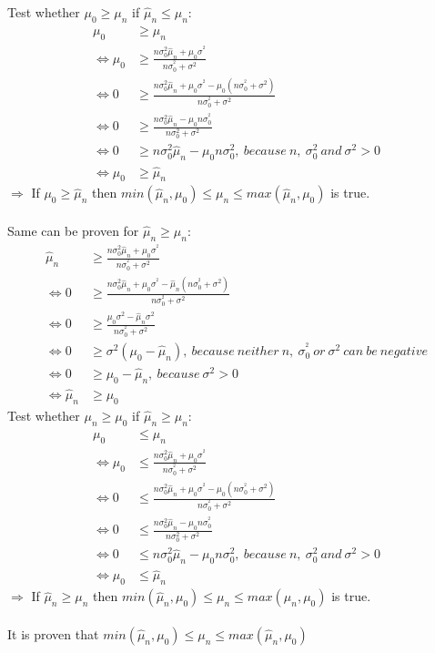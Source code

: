 \hspace*{5mm}Test whether $\mu_0\geq \mu_n$ if $\hat{\mu}_n \leq \mu_n$:
\begin{align*}
    \mu_0&\geq \mu_n \\
    \Leftrightarrow \mu_0&\geq\frac{n\sigma^{2}_0\hat{\mu}_n + \mu_0\sigma^{^2}}{n\sigma^{^2}_{0}+\sigma^{2}}\\
    \Leftrightarrow 0&\geq\frac{n\sigma^{2}_0\hat{\mu}_n + \mu_0\sigma^{^2}-\mu_0(n\sigma^{^2}_{0}+\sigma^{2})}{n\sigma^{^2}_{0}+\sigma^{2}}\\
    \Leftrightarrow 0&\geq\frac{n\sigma^{2}_0\hat{\mu}_n -\mu_0n\sigma^{^2}_{0}}{n\sigma^{2}_{0}+\sigma^{2}}\\
    \Leftrightarrow 0&\geq n\sigma^{2}_0\hat{\mu}_n -\mu_0n\sigma^{2}_{0},\ because\ n,\ \sigma^{2}_{0}\ and\  \sigma^{2}>0\\
    \Leftrightarrow \mu_0&\geq \hat{\mu}_n
\end{align*}
\hspace*{5mm}$\Rightarrow$ If $\mu_0\geq \hat{\mu}_n$ then $min(\hat{\mu}_n, \mu_0)\leq \mu_n \leq max(\hat{\mu}_n, \mu_0)$ is true.\\ \\
\hspace*{2mm} Same can be proven for $\hat{\mu}_n \geq \mu_n$:
\begin{align*}
\hat{\mu}_n &\geq\frac{n\sigma^{2}_0\hat{\mu}_n + \mu_0\sigma^{^2}}{n\sigma^{^2}_{0}+\sigma^{2}}\\
\Leftrightarrow0&\geq\frac{n\sigma^{2}_0\hat{\mu}_n + \mu_0\sigma^{^2}-\hat{\mu}_n(n\sigma^{^2}_{0}+\sigma^{2})}{n\sigma^{^2}_{0}+\sigma^{2}}\\
\Leftrightarrow0&\geq\frac{\mu_0\sigma^{2}-\hat{\mu}_n\sigma^{2}}{n\sigma^{^2}_{0}+\sigma^{2}}\\
\Leftrightarrow 0&\geq \sigma^{2}(\mu_0-\hat{\mu}_n),\ because\ neither\ n,\ \sigma^{^2}_{0}\ or\ \sigma^{2}\ can\ be\ negative\\
\Leftrightarrow 0&\geq \mu_0-\hat{\mu}_n,\ because\ \sigma^{2}>0\\
\Leftrightarrow \hat{\mu}_n&\geq \mu_0
\end{align*}
\hspace*{5mm}Test whether $\mu_n\geq \mu_0$ if $\hat{\mu}_n \geq \mu_n$:
\begin{align*}
    \mu_0&\leq \mu_n \\
    \Leftrightarrow \mu_0&\leq\frac{n\sigma^{2}_0\hat{\mu}_n + \mu_0\sigma^{^2}}{n\sigma^{^2}_{0}+\sigma^{2}}\\
    \Leftrightarrow 0&\leq\frac{n\sigma^{2}_0\hat{\mu}_n + \mu_0\sigma^{^2}-\mu_0(n\sigma^{^2}_{0}+\sigma^{2})}{n\sigma^{^2}_{0}+\sigma^{2}}\\
    \Leftrightarrow 0&\leq\frac{n\sigma^{2}_0\hat{\mu}_n -\mu_0n\sigma^{^2}_{0}}{n\sigma^{2}_{0}+\sigma^{2}}\\
    \Leftrightarrow 0&\leq n\sigma^{2}_0\hat{\mu}_n -\mu_0n\sigma^{2}_{0},\ because\ n,\ \sigma^{2}_{0}\ and\  \sigma^{2}>0\\
    \Leftrightarrow \mu_0&\leq \hat{\mu}_n
\end{align*}
\hspace*{5mm}$\Rightarrow$ If $\hat{\mu}_n\geq \mu_n$ then $min(\hat{\mu}_n, \mu_0)\leq \mu_n \leq max(\hat{\mu}_n, \mu_0)$ is true.\\ \\
It is proven that $min(\hat{\mu}_n, \mu_0)\leq \mu_n \leq max(\hat{\mu}_n, \mu_0)$